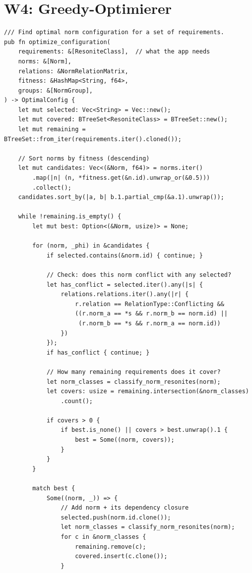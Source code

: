 \documentclass[11pt,a4paper]{article}
\begin{document}
\section{W4: Greedy-Optimierer}
\label{sec:w4}

\begin{lstlisting}[style=rust]
/// Find optimal norm configuration for a set of requirements.
pub fn optimize_configuration(
    requirements: &[ResoniteClass],  // what the app needs
    norms: &[Norm],
    relations: &NormRelationMatrix,
    fitness: &HashMap<String, f64>,
    groups: &[NormGroup],
) -> OptimalConfig {
    let mut selected: Vec<String> = Vec::new();
    let mut covered: BTreeSet<ResoniteClass> = BTreeSet::new();
    let mut remaining = BTreeSet::from_iter(requirements.iter().cloned());
    
    // Sort norms by fitness (descending)
    let mut candidates: Vec<(&Norm, f64)> = norms.iter()
        .map(|n| (n, *fitness.get(&n.id).unwrap_or(&0.5)))
        .collect();
    candidates.sort_by(|a, b| b.1.partial_cmp(&a.1).unwrap());
    
    while !remaining.is_empty() {
        let mut best: Option<(&Norm, usize)> = None;
        
        for (norm, _phi) in &candidates {
            if selected.contains(&norm.id) { continue; }
            
            // Check: does this norm conflict with any selected?
            let has_conflict = selected.iter().any(|s| {
                relations.relations.iter().any(|r| {
                    r.relation == RelationType::Conflicting &&
                    ((r.norm_a == *s && r.norm_b == norm.id) ||
                     (r.norm_b == *s && r.norm_a == norm.id))
                })
            });
            if has_conflict { continue; }
            
            // How many remaining requirements does it cover?
            let norm_classes = classify_norm_resonites(norm);
            let covers: usize = remaining.intersection(&norm_classes)
                .count();
            
            if covers > 0 {
                if best.is_none() || covers > best.unwrap().1 {
                    best = Some((norm, covers));
                }
            }
        }
        
        match best {
            Some((norm, _)) => {
                // Add norm + its dependency closure
                selected.push(norm.id.clone());
                let norm_classes = classify_norm_resonites(norm);
                for c in &norm_classes {
                    remaining.remove(c);
                    covered.insert(c.clone());
                }
                

\end{lstlisting}
\end{document}
